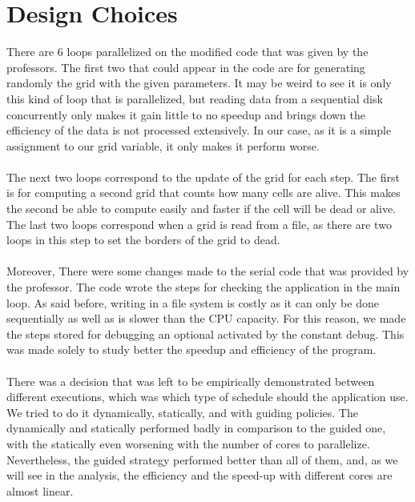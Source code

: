 \documentclass[11pt, a4paper]{article}
\begin{document}
	\section{Design Choices}
	There are 6 loops parallelized on the modified code that was given by the professors. The first two that could appear in the code are for generating randomly the grid with the given parameters. It may be weird to see it is only this kind of loop that is parallelized, but reading data from a sequential disk concurrently only makes it gain little to no speedup and brings down the efficiency of the data is not processed extensively. In our case, as it is a simple assignment to our grid variable, it only makes it perform worse. \\
	\\
	The next two loops correspond to the update of the grid for each step. The first is for computing a second grid that counts how many cells are alive. This makes the second be able to compute easily and faster if the cell will be dead or alive. The last two loops correspond when a grid is read from a file, as there are two loops in this step to set the borders of the grid to dead.\\
	\\
	Moreover, There were some changes made to the serial code that was provided by the professor. The code wrote the steps for checking the application in the main loop. As said before, writing in a file system is costly as it can only be done sequentially as well as is slower than the CPU capacity. For this reason, we made the steps stored for debugging an optional activated by the constant debug. This was made solely to study better the speedup and efficiency of the program.\\
	\\
	There was a decision that was left to be empirically demonstrated between different executions, which was which type of schedule should the application use. We tried to do it dynamically, statically, and with guiding policies. The dynamically and statically performed badly in comparison to the guided one, with the statically even worsening with the number of cores to parallelize. Nevertheless, the guided strategy performed better than all of them, and, as we will see in the analysis, the efficiency and the speed-up with different cores are almost linear.
	\\
	\\
\end{document}
